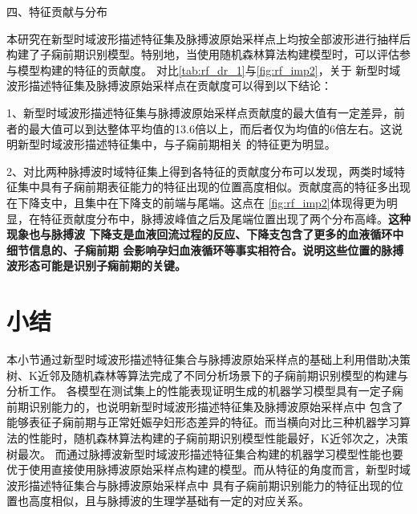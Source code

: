 四、特征贡献与分布

本研究在新型时域波形描述特征集及脉搏波原始采样点上均按全部波形进行抽样后构建了子痫前期识别模型。特别地，当使用随机森林算法构建模型时，可以评估参与模型构建的特征的贡献度。
对比\autoref{tab:rf_dr_1}与\autoref{fig:rf_imp2}，关于
新型时域波形描述特征集及脉搏波原始采样点在贡献度可以得到以下结论：

1、新型时域波形描述特征集与脉搏波原始采样点贡献度的最大值有一定差异，前者的最大值可以到达整体平均值的13.6倍以上，而后者仅为均值的6倍左右。这说明新型时域波形描述特征集中，与子痫前期相关
的特征更为明显。

2、对比两种脉搏波时域特征集上得到各特征的贡献度分布可以发现，两类时域特征集中具有子痫前期表征能力的特征出现的位置高度相似。贡献度高的特征多出现在下降支中，且集中在下降支的前端与尾端。这点在
\autoref{fig:rf_imp2}体现得更为明显，在特征贡献度分布中，脉搏波峰值之后及尾端位置出现了两个分布高峰。\textbf{这种现象也与脉搏波
下降支是血液回流过程的反应、下降支包含了更多的血液循环中细节信息的、子痫前期
会影响孕妇血液循环等事实相符合。说明这些位置的脉搏波形态可能是识别子痫前期的关键。}

\section{小结}
本小节通过新型时域波形描述特征集合与脉搏波原始采样点的基础上利用借助决策树、K近邻及随机森林等算法完成了不同分析场景下的子痫前期识别模型的构建与分析工作。
各模型在测试集上的性能表现证明生成的机器学习模型具有一定子痫前期识别能力的，也说明新型时域波形描述特征集及脉搏波原始采样点中
包含了能够表征子痫前期与正常妊娠孕妇形态差异的特征。而当横向对比三种机器学习算法的性能时，随机森林算法构建的子痫前期识别模型性能最好，K近邻次之，决策树最次。
而通过脉搏波新型时域波形描述特征集合构建的机器学习模型性能也要优于使用直接使用脉搏波原始采样点构建的模型。而从特征的角度而言，新型时域波形描述特征集合与脉搏波原始采样点中
具有子痫前期识别能力的特征出现的位置也高度相似，且与脉搏波的生理学基础有一定的对应关系。
